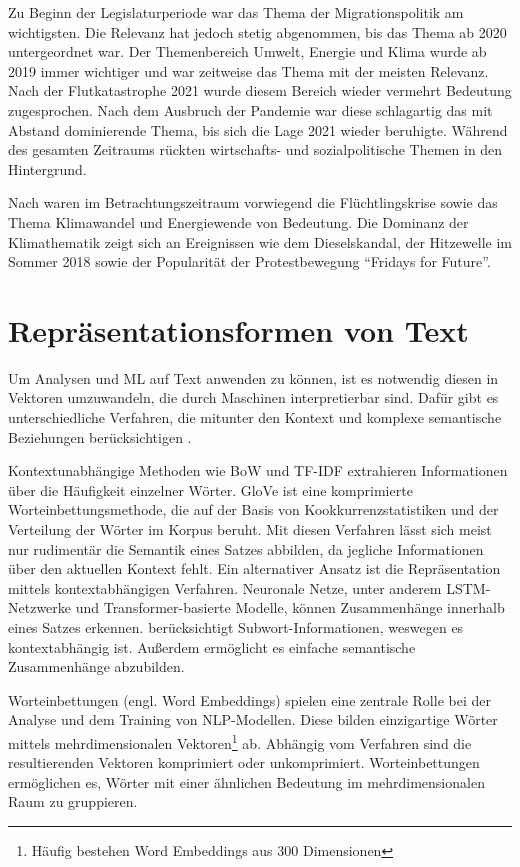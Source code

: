 Zu Beginn der Legislaturperiode war das Thema der Migrationspolitik am wichtigsten. Die Relevanz hat jedoch stetig abgenommen, bis das Thema ab \num{2020} untergeordnet war. Der Themenbereich Umwelt, Energie und Klima wurde ab \num{2019} immer wichtiger und war zeitweise das Thema mit der meisten Relevanz. Nach der Flutkatastrophe \num{2021} wurde diesem Bereich wieder vermehrt Bedeutung zugesprochen. Nach dem Ausbruch der Pandemie war diese schlagartig das mit Abstand dominierende Thema, bis sich die Lage \num{2021} wieder beruhigte. Während des gesamten Zeitraums rückten wirtschafts- und sozialpolitische Themen in den Hintergrund.

Nach \textcite{niedermayer_entwicklung_2020} waren im Betrachtungszeitraum vorwiegend die Flüchtlingskrise sowie das Thema Klimawandel und Energiewende von Bedeutung. Die Dominanz der Klimathematik zeigt sich an Ereignissen wie dem Dieselskandal, der Hitzewelle im Sommer \num{2018} sowie der Popularität der Protestbewegung \enquote{Fridays for Future}.

\section{Repräsentationsformen von Text} \label{sec:representationForms}

Um Analysen und \ac{ML} auf Text anwenden zu können, ist es notwendig diesen in Vektoren umzuwandeln, die durch Maschinen interpretierbar sind. Dafür gibt es unterschiedliche Verfahren, die mitunter den Kontext und komplexe semantische Beziehungen berücksichtigen \autocite{kowsari_text_2019, jurafsky_speech_2023}.

Kontextunabhängige Methoden wie \ac{BoW} und \ac{TF-IDF} extrahieren Informationen über die Häufigkeit einzelner Wörter. \ac{GloVe} ist eine komprimierte Worteinbettungsmethode, die auf der Basis von Kookkurrenzstatistiken und der Verteilung der Wörter im Korpus beruht. Mit diesen Verfahren lässt sich meist nur rudimentär die Semantik eines Satzes abbilden, da jegliche Informationen über den aktuellen Kontext fehlt. Ein alternativer Ansatz ist die Repräsentation mittels kontextabhängigen Verfahren. Neuronale Netze, unter anderem \ac{LSTM}-Netzwerke und Transformer-basierte Modelle, können Zusammenhänge innerhalb eines Satzes erkennen. \ft berücksichtigt Subwort-Informationen, weswegen es kontextabhängig ist. Außerdem ermöglicht es einfache semantische Zusammenhänge abzubilden.

Worteinbettungen (engl. Word Embeddings) spielen eine zentrale Rolle bei der Analyse und dem Training von \ac{NLP}-Modellen. Diese bilden einzigartige Wörter mittels mehrdimensionalen Vektoren\footnote{Häufig bestehen Word Embeddings aus \num{300} Dimensionen} ab. Abhängig vom Verfahren sind die resultierenden Vektoren komprimiert oder unkomprimiert. Worteinbettungen ermöglichen es, Wörter mit einer ähnlichen Bedeutung im mehrdimensionalen Raum zu gruppieren.

